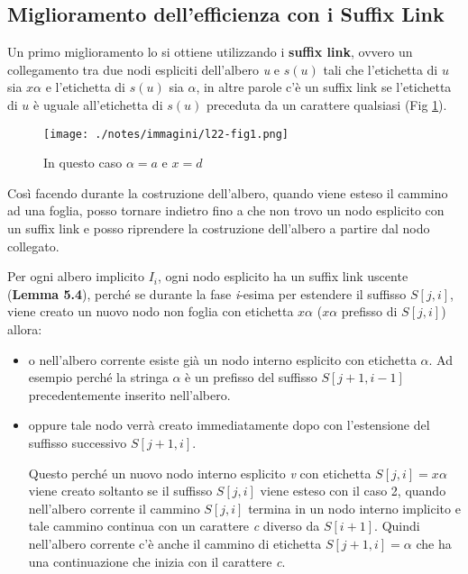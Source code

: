 

\subsection{Miglioramento dell'efficienza con i Suffix Link}

Un primo miglioramento lo si ottiene utilizzando i \textbf{suffix link}, ovvero un collegamento tra due nodi espliciti dell'albero \textit{u} e $ s(u) $ tali che l'etichetta di $ u $ sia $ x\alpha $ e l'etichetta di $ s(u) $ sia $ \alpha $, in altre parole c'è un suffix link se l'etichetta di $ u $ è uguale all'etichetta di $ s(u) $ preceduta da un carattere qualsiasi (Fig \ref{asdasdasd2}).

\begin{figure}[htbp]
	\centering
	\texttt{[image: ./notes/immagini/l22-fig1.png]}
	\caption{In questo caso $\alpha=a$ e $x=d$}\label{asdasdasd2}
\end{figure}

Così facendo durante la costruzione dell'albero, quando viene esteso il cammino ad una foglia, posso tornare indietro fino a che non trovo un nodo esplicito con un suffix link e posso riprendere la costruzione dell'albero a partire dal nodo collegato.

Per ogni albero implicito $ I_i $, ogni nodo esplicito ha un suffix link uscente (\textbf{Lemma 5.4}), perché se durante la fase \textit{i}-esima per estendere il suffisso $ S[j,i] $, viene creato un nuovo nodo non foglia con etichetta $ x\alpha $ ($x\alpha$ prefisso di $ S[j,i] $) allora:

\begin{itemize}
	\item o nell'albero corrente esiste già un nodo interno esplicito con etichetta $\alpha$. Ad esempio perché la stringa $\alpha$ è un prefisso del suffisso $S[j+1, i-1]$ precedentemente inserito nell'albero.
	\item oppure tale nodo verrà creato immediatamente dopo con l'estensione del suffisso successivo $ S[j+1,i] $.
	
	Questo perché un nuovo nodo interno esplicito \textit{v} con etichetta $ S[j,i] = x\alpha $ viene creato soltanto se il suffisso $ S[j,i] $ viene esteso con il caso 2, quando nell'albero corrente il cammino $ S[j,i] $ termina in un nodo interno implicito e tale cammino continua con un carattere \textit{c} diverso da $S[i+1]$.
	Quindi nell'albero corrente c'è anche il cammino di etichetta $S[j+1,i] = \alpha$ che ha una continuazione che inizia con il carattere \textit{c}.
\end{itemize}

